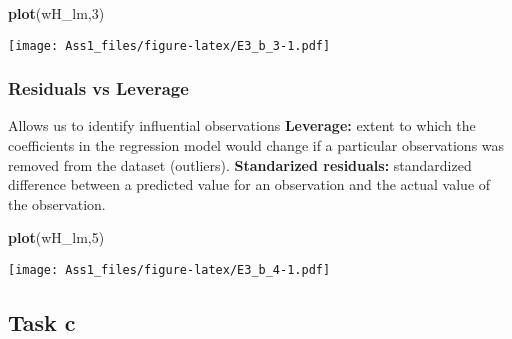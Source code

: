 \documentclass[
]{article}
\newenvironment{Shaded}{\begin{snugshade}}{\end{snugshade}}
\newcommand{\DecValTok}[1]{\textcolor[rgb]{0.00,0.00,0.81}{#1}}
\newcommand{\FunctionTok}[1]{\textcolor[rgb]{0.13,0.29,0.53}{\textbf{#1}}}
\newcommand{\NormalTok}[1]{#1}
\begin{document}
\begin{Shaded}
\begin{Highlighting}[]
\FunctionTok{plot}\NormalTok{(wH\_lm,}\DecValTok{3}\NormalTok{)}
\end{Highlighting}
\end{Shaded}

\texttt{[image: Ass1\_files/figure-latex/E3\_b\_3-1.pdf]}

\subsubsection{Residuals vs Leverage}\label{residuals-vs-leverage}

Allows us to identify influential observations \textbf{Leverage:} extent
to which the coefficients in the regression model would change if a
particular observations was removed from the dataset (outliers).
\textbf{Standarized residuals:} standardized difference between a
predicted value for an observation and the actual value of the
observation.

\begin{Shaded}
\begin{Highlighting}[]
\FunctionTok{plot}\NormalTok{(wH\_lm,}\DecValTok{5}\NormalTok{)}
\end{Highlighting}
\end{Shaded}

\texttt{[image: Ass1\_files/figure-latex/E3\_b\_4-1.pdf]}

\subsection{Task c}\label{task-c-2}
\end{document}
